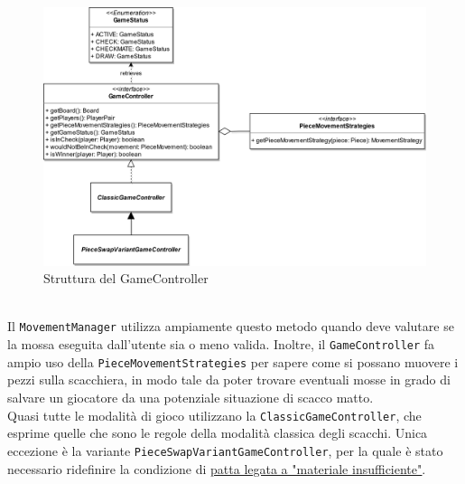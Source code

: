 \documentclass[a4paper,12pt]{report}
\begin{document}
\begin{figure}[H]
    \begin{center}
        \centering
        \includegraphics[scale=0.8]{img/Stefano/GameController.png}
    \end{center}
    \caption{Struttura del GameController}
    \label{img:GameController}
\end{figure}
\
\\
Il \texttt{MovementManager} utilizza ampiamente questo metodo quando deve valutare se la mossa eseguita dall'utente sia o meno valida.
Inoltre, il \texttt{GameController} fa ampio uso della \texttt{PieceMovementStrategies} per sapere come si possano muovere i pezzi sulla scacchiera, in modo tale da poter trovare eventuali mosse in grado di salvare un giocatore da una potenziale situazione di scacco matto.
\\
Quasi tutte le modalità di gioco utilizzano la \texttt{ClassicGameController}, che esprime quelle che sono le regole della modalità classica degli scacchi. Unica eccezione è la variante \texttt{PieceSwapVariantGameController}, per la quale è stato necessario ridefinire la condizione di \href{https://support.chess.com/article/128-what-does-insufficient-mating-material-mean}{\underline{patta legata a "materiale insufficiente"}}.
\end{document}
